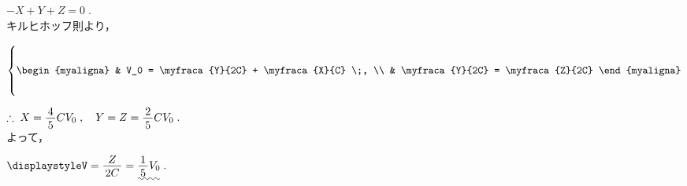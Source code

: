 ﻿\documentclass[../../../ps_a.tex]{subfiles}
\begin{document}
\begin{enumerate}
            \myspaceb%
            $\displaystyle%
                -X + Y + Z = 0 \;.
            $\\
            キルヒホッフ則より，
            
            \myspaceb%
            $\displaystyle%
                \left\{\vphantom{\rule{0pt}{28pt}}
                \begin{myaligna}
                    & V_0 = \myfraca{Y}{2C} +  \myfraca{X}{C} \;, \\
                    & \myfraca{Y}{2C} = \myfraca{Z}{2C}
                \end{myaligna}
                \right.
            $

            \myspaceb%
            $\displaystyle%
                    \therefore \; X = \myfraca{4}{5} CV_0 \;,%
                    \quad Y = Z = \myfraca{2}{5} CV_0 \;.
            $\\            
            よって，
            
            \myspaceb%
            $\displaystyle%
                V = \myfraca{Z}{2C} = \uwave{\myfraca{1}{5} V_0} \;.
            $        
    \end{enumerate}
\end{document}
